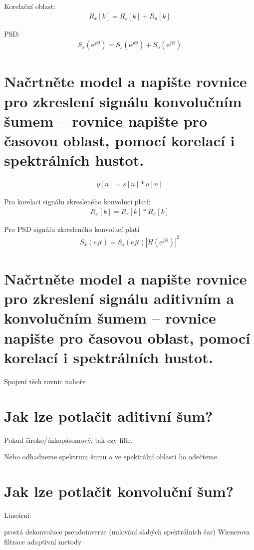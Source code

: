 \documentclass[a4paper,12pt]{article}   %
\newcommand{\ejt}{\text{e}^{j\Theta}}
\begin{document}
Korelační oblast:
\begin{align*}
        R_x[k] = R_s[k] + R_u[k]
\end{align*}

PSD:
\begin{align*}
        S_x(\ejt) = S_s(\ejt) + S_u(\ejt)
\end{align*}


\section{Načrtněte model a napište rovnice pro zkreslení signálu konvolučním šumem – rovnice napište pro časovou oblast, pomocí korelací i spektrálních hustot.}
\begin{align*}
        y[n] = s[n]\ast u[n]
\end{align*}

Pro korelaci signálu zkresleného konvolucí platí:
\begin{align*}
        R_x[k] = R_s[k]\ast R_h[k]
\end{align*}

Pro PSD signálu zkresleného konvolucí platí
\begin{align*}
        S_x(ejt) = S_s(ejt)|H(\ejt)|^2
\end{align*}


\section{Načrtněte model a napište rovnice pro zkreslení signálu aditivním a konvolučním šumem – rovnice napište pro časovou oblast, pomocí korelací i spektrálních hustot.}

Spojení těch rovnic nahoře


\section{Jak lze potlačit aditivní šum?}
Pokud široko/úzkopásomový, tak ezy filtr. 

Nebo odhadneme spektrum šumu a ve spektrální oblasti ho odečteme.


\section{Jak lze potlačit konvoluční šum?}

Lineární:
\begin{outline}
        \1 prostá dekonvoluce
        \1 pseudoinverze (nulování slabých spektrálních čar)
        \1 Wienerova filtrace 
        \1 adaptivní metody
\end{outline}
\end{document}
